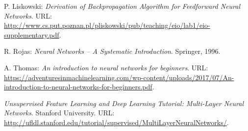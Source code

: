 \documentclass[12pt,a4paper,finnish,oneside,titlepage]{article}
\theoremstyle{plain}
\theoremstyle{definition}
\theoremstyle{remark}
\begin{document}

\begin{thebibliography}{99}
 P. Liskowski: \emph{Derivation of Backpropagation Algorithm
for Feedforward Neural Networks}. URL: \href{http://www.cs.put.poznan.pl/pliskowski/pub/teaching/eio/lab1/eio-supplementary.pdf}{http://www.cs.put.poznan.pl/pliskowski/pub/teaching/eio/lab1/eio-supplementary.pdf}.

 R. Rojas: \emph{Neural Networks -- A Systematic Introduction}. Springer, 1996.

 A. Thomas: \emph{An introduction to neural
networks for beginners}. URL: \href{https://adventuresinmachinelearning.com/wp-content/uploads/2017/07/An-introduction-to-neural-networks-for-beginners.pdf}{https://adventuresinmachinelearning.com/wp-content/uploads/2017/07/An-introduction-to-neural-networks-for-beginners.pdf}.

 \emph{Unsupervised Feature Learning and Deep Learning Tutorial: Multi-Layer Neural Networks}. Stanford University. URL: \href{http://ufldl.stanford.edu/tutorial/supervised/MultiLayerNeuralNetworks/}{http://ufldl.stanford.edu/tutorial/supervised/MultiLayerNeuralNetworks/}.
\end{thebibliography}
\end{document}
